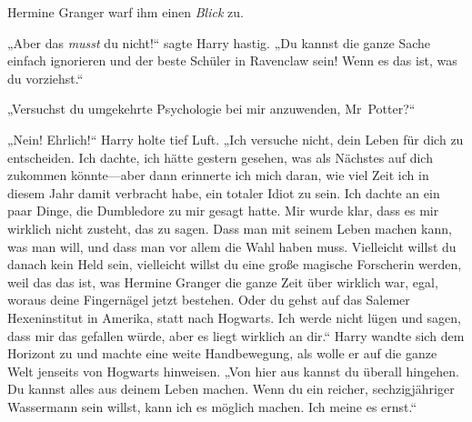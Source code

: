 Hermine Granger warf ihm einen \emph{Blick} zu.

„Aber das \emph{musst} du nicht!“ sagte Harry hastig. „Du kannst die ganze Sache einfach ignorieren und der beste Schüler in Ravenclaw sein! Wenn es das ist, was du vorziehst.“

„Versuchst du umgekehrte Psychologie bei mir anzuwenden, Mr~Potter?“

„Nein! Ehrlich!“ Harry holte tief Luft. „Ich versuche nicht, dein Leben für dich zu entscheiden. Ich dachte, ich hätte gestern gesehen, was als Nächstes auf dich zukommen könnte—aber dann erinnerte ich mich daran, wie viel Zeit ich in diesem Jahr damit verbracht habe, ein totaler Idiot zu sein. Ich dachte an ein paar Dinge, die Dumbledore zu mir gesagt hatte. Mir wurde klar, dass es mir wirklich nicht zusteht, das zu sagen. Dass man mit seinem Leben machen kann, was man will, und dass man vor allem die Wahl haben muss. Vielleicht willst du danach kein Held sein, vielleicht willst du eine große magische Forscherin werden, weil das das ist, was Hermine Granger die ganze Zeit über wirklich war, egal, woraus deine Fingernägel jetzt bestehen. Oder du gehst auf das Salemer Hexeninstitut in Amerika, statt nach Hogwarts. Ich werde nicht lügen und sagen, dass mir das gefallen würde, aber es liegt wirklich an dir.“ Harry wandte sich dem Horizont zu und machte eine weite Handbewegung, als wolle er auf die ganze Welt jenseits von Hogwarts hinweisen. „Von hier aus kannst du überall hingehen. Du kannst alles aus deinem Leben machen. Wenn du ein reicher, sechzigjähriger Wassermann sein willst, kann ich es möglich machen. Ich meine es ernst.“

